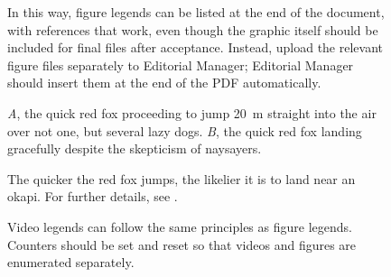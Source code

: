 \documentclass[11pt]{article}
\begin{document}
\begin{figure}[h!]
\caption{In this way, figure legends can be listed at the end of the document, with references that work, even though the graphic itself should be included for final files after acceptance. Instead, upload the relevant figure files separately to Editorial Manager; Editorial Manager should insert them at the end of the PDF automatically.}
\label{Fig:AnotherFigure}
\end{figure}


\renewcommand{\thefigure}{A\arabic{figure}}
\setcounter{figure}{0}

\begin{figure}[h!]
\caption{\textit{A}, the quick red fox proceeding to jump 20~m straight into the air over not one, but several lazy dogs. \textit{B}, the quick red fox landing gracefully despite the skepticism of naysayers.}
\label{Fig:Jumps}
\end{figure}

\begin{figure}[h!]
\caption{The quicker the red fox jumps, the likelier it is to land near an okapi. For further details, see \citet{LemKapEx07}.}
\label{Fig:JumpsOk}
\end{figure}




\renewcommand{\figurename}{Video} 
\renewcommand{\thefigure}{S\arabic{figure}}
\setcounter{figure}{0}

\begin{figure}[h!]
\caption{Video legends can follow the same principles as figure legends. Counters should be set and reset so that videos and figures are enumerated separately.}
\label{VideoExample}
\end{figure}

\renewcommand{\figurename}{Figure}
\setcounter{figure}{1}

\end{document}
